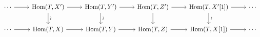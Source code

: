 \documentclass[12pt]{standalone}
\begin{document}
        $$

\begin{tikzcd}
\cdots \ar[r] & \operatorname{Hom}(T,X^\prime) \ar[r] \ar[d,"\sim"{sloped}] & \operatorname{Hom}(T,Y^\prime) 
\ar[r] \ar[d,"\sim"{sloped}] & \operatorname{Hom}(T,Z^\prime) \ar[r] \ar[d] & \operatorname{Hom}(T,X^\prime[1]) 
\ar[r] \ar[d,"\sim"{sloped}] & \cdots \\
\cdots \ar[r] & \operatorname{Hom}(T,X) \ar[r]  & \operatorname{Hom}(T,Y) 
\ar[r]  & \operatorname{Hom}(T,Z) \ar[r]  & \operatorname{Hom}(T,X[1]) 
\ar[r]  & \cdots
\end{tikzcd}
        $$
        
\end{document}
